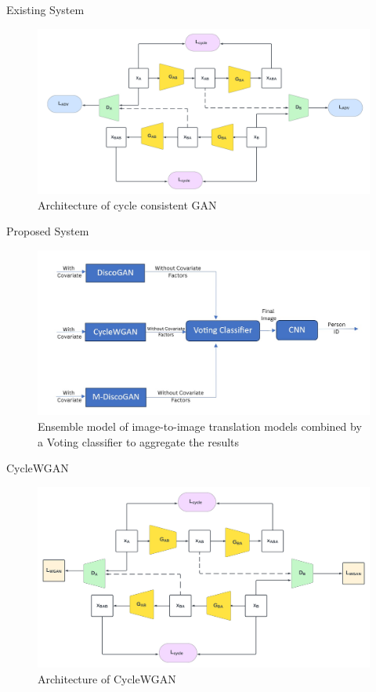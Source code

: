 \documentclass[xcolor=dvipsnames]{beamer}
\begin{document}
\begin{frame}{Existing System}
    \begin{figure}
    \centering
    \includegraphics[scale = 0.28]{ppt/img/color-cc.png}
    \caption{Architecture of cycle consistent GAN}
    \label{fig:enter-label}
\end{figure}
\end{frame}

\begin{frame}{Proposed System}
\begin{figure}
    \centering
    \includegraphics[scale = 0.35]{ppt/img/vc.jpg}
    \caption{Ensemble model of image-to-image translation models combined by a Voting classifier to aggregate the results}
    \label{fig:enter-label}
\end{figure}
\end{frame}

\begin{frame}{CycleWGAN}
\begin{figure}
    \centering
    \includegraphics[scale = 0.3]{ppt/img/color-cw.png}
    \caption{Architecture of CycleWGAN}
    \label{fig:enter-label}
\end{figure}
\end{frame}
\end{document}
